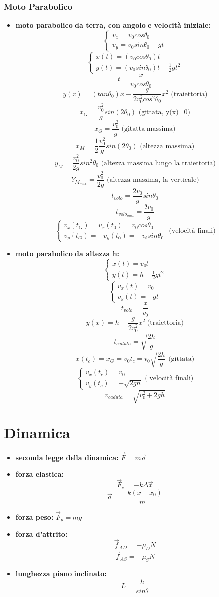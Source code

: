 \documentclass[a4paper,12pt, oneside]{book}
\begin{document}
\subsubsection{Moto Parabolico}
\begin{itemize}
\item \textbf{moto parabolico da terra, con angolo e velocità iniziale:}
$$
\begin{cases}
v_x=v_0cos\theta_0\\
v_y=v_0sin\theta_0-gt
\end{cases}
$$
$$\begin{cases}
x(t)=(v_0cos\theta_0)t\\
y(t)=(v_0sin\theta_0)t-\frac{1}{2}gt^2
\end{cases}$$
$$t=\frac{x}{v_0cos\theta_0}$$
$$y(x)=(tan\theta_0)x-\frac{g}{2v_0^2cos^2\theta_0}x^2\mbox{ (traiettoria)}$$
$$x_G=\frac{v_0^2}{g}sin(2\theta_0)\mbox{ (gittata, y(x)=0)}$$
$$x_G=\frac{v_0^2}{g}\mbox{ (gitatta massima)}$$
$$x_M=\frac{1}{2}\frac{v_0^2}{g}sin(2\theta_0)\mbox{ (altezza massima)}$$
$$y_M=\frac{v_0^2}{2g}sin^2\theta_0 \mbox{ (altezza massima lungo la traiettoria)}$$
$$Y_{M_{max}}=\frac{v_0^2}{2g}\mbox{ (altezza massima, la verticale)}$$
$$t_{volo}=\frac{2v_0}{g}sin\theta_0$$
$$t_{{volo}_{max}}=\frac{2v_0}{g}$$
$$\begin{cases}
v_x(t_G)=v_x(t_0)=v_0cos\theta_0\\
v_y(t_G)=-v_y(t_0)=-v_0sin\theta_0
\end{cases}\mbox{ (velocità finali)}$$
\item \textbf{moto parabolico da altezza h:}
$$\begin{cases}
x(t)=v_0t\\
y(t)=h-\frac{1}{2}gt^2
\end{cases}$$
$$\begin{cases}
v_x(t)=v_0\\
v_y(t)=-gt
\end{cases}$$
$$t_{volo}=\frac{x}{v_0}$$
$$y(x)=h-\frac{g}{2v_0^2}x^2\mbox{ (traiettoria)}$$
$$t_{caduta}=\sqrt{\frac{2h}{g}}$$
$$x(t_c)=x_G=v_0t_c=v_0\sqrt{\frac{2h}{g}}\mbox{ (gittata)}$$
$$\begin{cases}v_x(t_c)=v_0\\
v_y(t_c)=-\sqrt{2gh}\end{cases} \mbox{( velocità finali)}$$
$$v_{caduta}=\sqrt{v_0^2+2gh}$$
\end{itemize}
\section{Dinamica}
\begin{itemize}
\item \textbf{seconda legge della dinamica:} $\vec{F}=m\vec{a}$
\item \textbf{forza elastica:}
$$\vec{F}_e=-k\Delta \vec{x}$$
$$\vec{a}=\frac{-k(x-x_0)}{m}$$
\item \textbf{forza peso:}
$\vec{F}_p=mg$
\item \textbf{forza d'attrito:}
$$\vec{f}_{AD}=-\mu_DN$$
$$\vec{f}_{AS}=-\mu_SN$$
\item \textbf{lunghezza piano inclinato:} $$L=\frac{h}{sin\theta}$$
\end{itemize}
\end{document}
